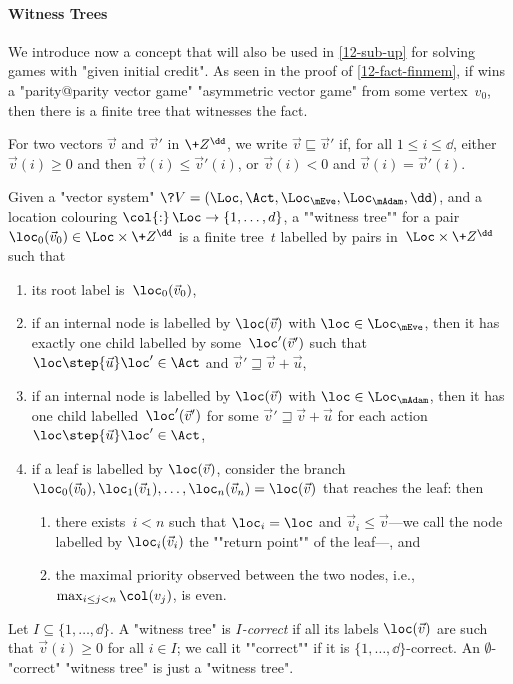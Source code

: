 
\paragraph{Witness Trees}
We introduce now a concept that will also be used in \cref{12-sub-up}
for solving games with "given initial credit".  As seen in the proof
of \cref{12-fact-finmem}, if \Eve wins a "parity@parity vector game"
"asymmetric vector game" from some vertex~$v_0$, then there is a
finite tree that witnesses the fact.

For two vectors $\vec v$ and $\vec v'$ in $\+Z^\dd$, we write $\vec
v\sqsubseteq \vec v'$ if, for all $1\leq i\leq\dd$, either $\vec
v(i)\geq 0$ and then $\vec v(i)\leq\vec v'(i)$, or $\vec v(i)<0$ and
$\vec v(i)=\vec v'(i)$.

\begin{definition}\label{12-def-wt}
  Given a "vector system"
  $\?V=(\Loc,\Act,\Loc_\mEve,\Loc_\mAdam,\dd)$, and a location
  colouring $\col{:}\,\Loc\to\{1,\dots,d\}$, a ""witness tree"" for a
  pair $\loc_0(\vec v_0)\in\Loc\times\+Z^\dd$ is a finite tree~$t$
  labelled by pairs in~$\Loc\times\+Z^\dd$ such that
\begin{enumerate}
\item its root label is~$\loc_0(\vec v_0)$,
\item if an internal node is labelled by $\loc(\vec v)$ with
  $\loc\in\Loc_\mEve$, then it has exactly one child labelled by
  some~$\loc'(\vec v')$ such that $\loc\step{\vec u}\loc'\in\Act$ and
  $\vec v'\sqsupseteq\vec v+\vec u$,
\item if an internal node is labelled by $\loc(\vec v)$ with
  $\loc\in\Loc_\mAdam$, then it has one child labelled~$\loc'(\vec
  v')$ for some $\vec v'\sqsupseteq\vec v+\vec u$ for each action
  $\loc\step{\vec u}\loc'\in\Act$,
\item\label{12-wt-self-even} if a leaf is labelled by $\loc(\vec v)$,
  consider the branch
  $\loc_0(\vec v_0),\loc_1(\vec v_1),\dots,\loc_n(\vec v_n)=\loc(\vec
  v)$ that reaches the leaf: then
  \begin{enumerate}
  \item\label{12-wt-self}there exists~$i<n$ such that
  $\loc_i=\loc$ and $\vec v_i\leq\vec v$---we call the node labelled by
  $\loc_i(\vec v_i)$ the ""return point"" of the leaf---, and
  \item\label{12-wt-even} the maximal priority observed between the two
  nodes, i.e., $\max_{i\leq j<n}\col(v_j)$, is even.
  \end{enumerate}
\end{enumerate}
\AP Let $I\subseteq \{1,\dots,\dd\}$.  A "witness tree" is
\emph{$I$-correct} if all its labels $\loc(\vec v)$ are such that
$\vec v(i)\geq 0$ for all $i\in I$; we call it ""correct"" if it is
$\{1,\dots,\dd\}$-correct.  An $\emptyset$-"correct" "witness tree" is
just a "witness tree".
\end{definition}

